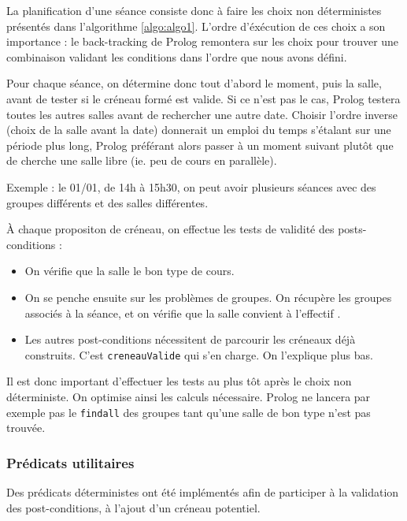 La planification d'une séance consiste donc à faire les choix non déterministes
présentés dans l'algorithme \ref{algo:algo1}. L'ordre d'éxécution de ces choix
a son importance : le back-tracking de Prolog remontera sur les choix pour
trouver une combinaison validant les conditions dans l'ordre que nous avons
défini.

Pour chaque séance, on détermine donc tout d'abord le moment, puis la salle,
avant de tester si le créneau formé est valide. Si ce n'est pas le cas, Prolog
testera toutes les autres salles avant de rechercher une autre date.
Choisir l'ordre inverse (choix de la salle avant la date) donnerait un emploi du
temps s'étalant sur une période plus long, Prolog préférant alors passer à un
moment suivant plutôt que de cherche une salle libre (ie. peu de cours en
parallèle).

Exemple : le 01/01, de 14h à 15h30, on peut avoir plusieurs séances avec des
groupes différents et des salles différentes.

À chaque propositon de créneau, on effectue les tests de validité des
posts-conditions :

\begin{itemize}

    \item On vérifie que la salle le bon type de cours.

    \item On se penche ensuite sur les problèmes de groupes. On récupère les
        groupes associés à la séance, et on vérifie que la salle convient à
        l'effectif .

    \item Les autres post-conditions nécessitent de parcourir les créneaux déjà
        construits. C'est \texttt{creneauValide} qui s'en charge. On l'explique
        plus bas.

\end{itemize}

Il est donc important d'effectuer les tests au plus tôt après le choix non
déterministe. On optimise ainsi les calculs nécessaire. Prolog ne lancera par
exemple pas le \texttt{findall} des groupes tant qu'une salle de bon type n'est
pas trouvée.

\subsubsection{Prédicats utilitaires}

Des prédicats déterministes ont été implémentés afin de participer à la
validation des post-conditions, à l'ajout d'un créneau potentiel.

